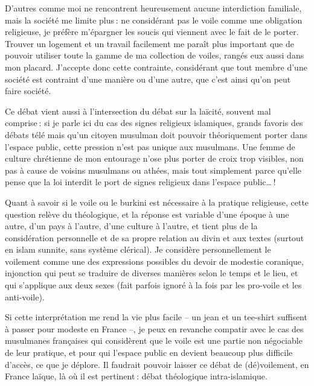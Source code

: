 D’autres comme moi ne rencontrent heureusement aucune interdiction familiale, mais la société me limite plus : ne considérant pas le voile comme une obligation religieuse, je préfère m’épargner les soucis qui viennent avec le fait de le porter. Trouver un logement et un travail facilement me paraît plus important que de pouvoir utiliser toute la gamme de ma collection de voiles, rangés eux aussi dans mon placard. J’accepte donc cette contrainte, considérant que tout membre d’une société est contraint d’une manière ou d’une autre, que c’est ainsi qu’on peut faire société.

Ce débat vient aussi à l’intersection du débat sur la laïcité, souvent mal comprise : si je parle ici du cas des signes religieux islamiques, grands favoris des débats télé mais qu’un citoyen musulman doit pouvoir théoriquement porter dans l’espace public, cette pression n’est pas unique aux musulmans. Une femme de culture chrétienne de mon entourage n’ose plus porter de croix trop visibles, non pas à cause de voisins musulmans ou athées, mais tout simplement parce qu’elle pense que la loi interdit le port de signes religieux dans l’espace public… !

Quant à savoir si le voile ou le burkini est nécessaire à la pratique religieuse, cette question relève du théologique, et la réponse est variable d’une époque à une autre, d’un pays à l’autre, d’une culture à l’autre, et tient plus de la considération personnelle et de sa propre relation au divin et aux textes (surtout en islam sunnite, sans système clérical). Je considère personnellement le voilement comme une des expressions possibles du devoir de modestie coranique, injonction qui peut se traduire de diverses manières selon le temps et le lieu, et qui s’applique aux deux sexes (fait parfois ignoré à la fois par les pro-voile et les anti-voile).

Si cette interprétation me rend la vie plus facile – un jean et un tee-shirt suffisent à passer pour modeste en France –, je peux en revanche compatir avec le cas des musulmanes françaises qui considèrent que le voile est une partie non négociable de leur pratique, et pour qui l’espace public en devient beaucoup plus difficile d’accès, ce que je déplore. Il faudrait pouvoir laisser ce débat de (dé)voilement, en France laïque, là où il est pertinent : débat théologique intra-islamique.